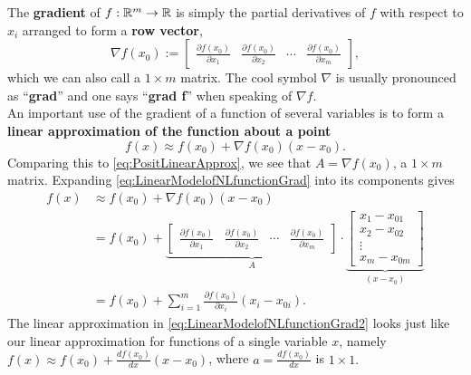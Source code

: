  \begin{tcolorbox}[title=\textbf{The Gradient and Linear Approximations}]
The \textbf{gradient} of $f:\mathbb R^m \to \mathbb R$ is simply the partial derivatives of $f$ with respect to $x_i$ arranged to form a \textbf{row vector},
\begin{equation}
    \label{eq:GradientDef}
    \nabla f(x_0):=\left[\begin{array}{cccc}
        \frac{\partial f(x_0)}{\partial x_1} &  \frac{\partial f(x_0)}{\partial x_2} & \cdots &  \frac{\partial f(x_0)}{\partial x_m} 
    \end{array} \right],
\end{equation}
which we can also call a $1 \times m$ matrix. The cool symbol $\nabla$ is usually pronounced as ``\textbf{grad}'' and one says ``\textbf{grad f}'' when speaking of $\nabla f$. \\

An important use of the gradient of a function of several variables is to form a \textbf{linear approximation of the function about a point}
\begin{equation}
    \label{eq:LinearModelofNLfunctionGrad}
      f(x) \approx f(x_0) + \nabla f(x_0) (x-x_0).
\end{equation}
Comparing this to \eqref{eq:PositLinearApprox}, we see that
$A= \nabla f(x_0)$,
a $1 \times m$ matrix. Expanding \eqref{eq:LinearModelofNLfunctionGrad} into its components gives
\begin{equation}
    \label{eq:LinearModelofNLfunctionGrad2}
    \begin{aligned}
      f(x) &\approx f(x_0) + \nabla f(x_0) (x-x_0)\\
      &=f(x_0) + \underbrace{\left[\begin{array}{cccc}
        \frac{\partial f(x_0)}{\partial x_1} &  \frac{\partial f(x_0)}{\partial x_2} & \cdots &  \frac{\partial f(x_0)}{\partial x_m} 
    \end{array} \right]}_{A} \cdot \underbrace{\left[\begin{array}{c}
        x_1-x_{01} \\
        x_2-x_{02} \\
        \vdots \\
        x_m-x_{0m}
    \end{array} \right]}_{(x-x_0)} \\
     &= f(x_0) + \sum_{i=1}^m  \frac{\partial f(x_0)}{\partial x_i} (x_i-x_{0i}).
      \end{aligned}
\end{equation}
The linear approximation in \eqref{eq:LinearModelofNLfunctionGrad2} looks just like our linear approximation for functions of a single variable $x$, namely $f(x) \approx f(x_0) + \frac{df(x_0)}{ dx} (x-x_0)$, where $a= \frac{df(x_0)}{ dx}$ is $1 \times 1.$

\end{tcolorbox}

